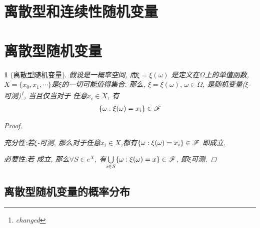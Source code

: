 \section{离散型和连续性随机变量}


\section{离散型随机变量}

\newtheorem{discrete_random_var}[theorem_root]{\theorem}
\begin{discrete_random_var}[离散型随机变量]
假设\prbsp 是一概率空间, 而\(\xi = \xi(\omega)\) 是定义在\(\Omega\)上的单值函数,
\(X = \{x_0, x_1, \cdots\}\)是\(\xi\)的一切可能值得集合. 
那么, \(\xi = \xi(\omega),\,\omega\in\Omega\), 是随机变量(\(\xi\)-可测)\footnote{changed}, 当且仅当对于
任意\(x_i\in X\), 有
\begin{align}
\label{equ:equopa}
\{\omega:\xi(\omega) = x_i\}\in\msF
\end{align}

\begin{proof}
\ \par 充分性:\quad 若\(\xi\)-可测, 那么对于任意\(x_i\in X\),都有\(\{\omega:\xi(\omega) = x_i\}\in\msF\)
即成立.

必要性:\quad 若 成立, 那么\(\forall S\in e^X\), 有\(\bigcup\limits_{i\in S}\{\omega: \xi(\omega) = x\}\in\msF\),
即\(\xi\)可测.
\end{proof}
\end{discrete_random_var}

\subsection{离散型随机变量的概率分布}
\newtheorem{degrade_distru}[dis_root]{\disfunc}
\newtheorem{binomial_distru}[dis_root]{\disfunc}
\newtheorem{negative_binomial_distru}[dis_root]{\disfunc}
\newtheorem{geometry_distru}[dis_root]{\disfunc}
\newtheorem{super_geometry_distru}[dis_root]{\disfunc}
\newtheorem{negative_super_geometry_distru}[dis_root]{\disfunc}
\newtheorem{poisson_distru}[dis_root]{\disfunc}

